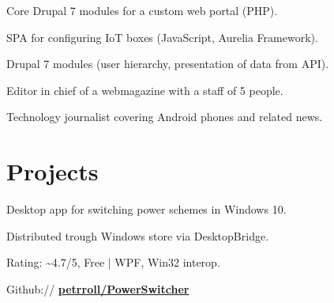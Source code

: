 \documentclass[a4paper]{deedy-resume} %
\begin{document}
\begin{minipage}[t]{0.62\textwidth}
\sectionspace %



\begin{tightitemize}
\item Core Drupal 7 modules for a custom web portal (PHP).
\item SPA for configuring IoT boxes (JavaScript, Aurelia Framework).
\end{tightitemize}

\begin{tightitemize}
\item Drupal 7 modules (user hierarchy, presentation of data from API).
\end{tightitemize}

\sectionspace %



\begin{tightitemize}
\item Editor in chief of a webmagazine with a staff of 5 people.
\item Technology journalist covering Android phones and related news.
\end{tightitemize}


\sectionspace %

\section{Projects}





\emptyLocation %
\begin{tightitemize}
\item Desktop app for switching power schemes in Windows 10.
\item Distributed trough Windows store via DesktopBridge.
\item Rating: \textasciitilde4.7/5, Free | WPF, Win32 interop.
\item Github:// \href{https://github.com/petrroll/PowerSwitcher}{\bf petrroll/PowerSwitcher}
\end{tightitemize}


\end{minipage}
\end{document}
